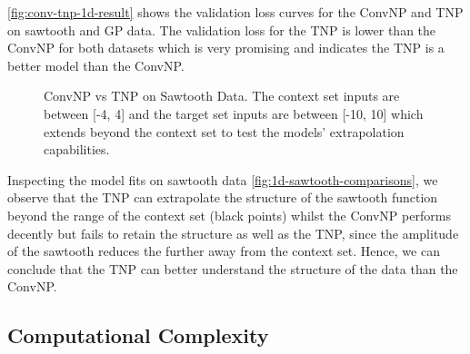 \documentclass[../../main.tex]{subfiles}
\begin{document}
\autoref{fig:conv-tnp-1d-result} shows the validation loss curves for the ConvNP and TNP on sawtooth and GP data. The validation loss for the TNP is lower than the ConvNP for both datasets which is very promising and indicates the TNP is a better model than the ConvNP. 


\begin{figure}[H]
	\centering
	\qquad
	\caption{ConvNP vs TNP on Sawtooth Data. The context set inputs are between [-4, 4] and the target set inputs are between [-10, 10] which extends beyond the context set to test the models' extrapolation capabilities.} 
	\label{fig:1d-sawtooth-comparisons}
\end{figure}

Inspecting the model fits on sawtooth data \autoref{fig:1d-sawtooth-comparisons}, we observe that the TNP can extrapolate the structure of the sawtooth function beyond the range of the context set (black points) whilst the ConvNP performs decently but fails to retain the structure as well as the TNP, since the amplitude of the sawtooth reduces the further away from the context set. Hence, we can conclude that the TNP can better understand the structure of the data than the ConvNP.

\subsection{Computational Complexity}
\end{document}
